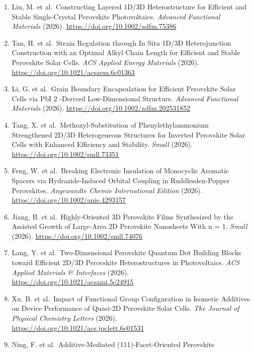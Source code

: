 \documentclass[
  11pt,
]{article}
\begin{document}
\begin{enumerate}
  Y, L. et al.~A Diammonium‐Based Non‐Dion‐Jacobson Phase 2D Perovskite
  With High Durability for Efficient and Stable 2D/3D Perovskite Solar
  Modules. \emph{Angewandte Chemie International Edition} (2026).
  \url{https://doi.org/10.1002/anie.2974414}
\item
  Liu, M. et al.~Constructing Layered 1D/3D Heterostructure for
  Efficient and Stable Single‐Crystal Perovskite Photovoltaics.
  \emph{Advanced Functional Materials} (2026).
  \url{https://doi.org/10.1002/adfm.75386}
\item
  Tan, H. et al.~Strain Regulation through In Situ 1D/3D Heterojunction
  Construction with an Optimal Alkyl Chain Length for Efficient and
  Stable Perovskite Solar Cells. \emph{ACS Applied Energy Materials}
  (2026). \url{https://doi.org/10.1021/acsaem.6c01363}
\item
  Li, G. et al.~Grain Boundary Encapsulation for Efficient Perovskite
  Solar Cells via PbI 2 ‐Derived Low‐Dimensional Structure.
  \emph{Advanced Functional Materials} (2026).
  \url{https://doi.org/10.1002/adfm.202531852}
\item
  Tang, X. et al.~Methoxyl‐Substitution of Phenylethylammonium
  Strengthened 2D/3D Heterogeneous Structures for Inverted Perovskite
  Solar Cells with Enhanced Efficiency and Stability. \emph{Small}
  (2026). \url{https://doi.org/10.1002/smll.73351}
\item
  Feng, W. et al.~Breaking Electronic Insulation of Monocyclic Aromatic
  Spacers via Hydrazide‐Induced Orbital Coupling in Ruddlesden‐Popper
  Perovskites. \emph{Angewandte Chemie International Edition} (2026).
  \url{https://doi.org/10.1002/anie.4293157}
\item
  Jiang, B. et al.~Highly‐Oriented 3D Perovskite Films Synthesized by
  the Assisted Growth of Large‐Area 2D Perovskite Nanosheets With n = 1.
  \emph{Small} (2026). \url{https://doi.org/10.1002/smll.74076}
\item
  Lang, Y. et al.~Two-Dimensional Perovskite Quantum Dot Building Blocks
  toward Efficient 2D/3D Perovskite Heterostructures in Photovoltaics.
  \emph{ACS Applied Materials \& Interfaces} (2026).
  \url{https://doi.org/10.1021/acsami.5c24915}
\item
  Xu, B. et al.~Impact of Functional Group Configuration in Isomeric
  Additives on Device Performance of Quasi-2D Perovskite Solar Cells.
  \emph{The Journal of Physical Chemistry Letters} (2026).
  \url{https://doi.org/10.1021/acs.jpclett.6c01531}
\item
  Ning, F. et al.~Additive‐Mediated (111)‐Facet‐Oriented Perovskite

\end{enumerate}
\end{document}
